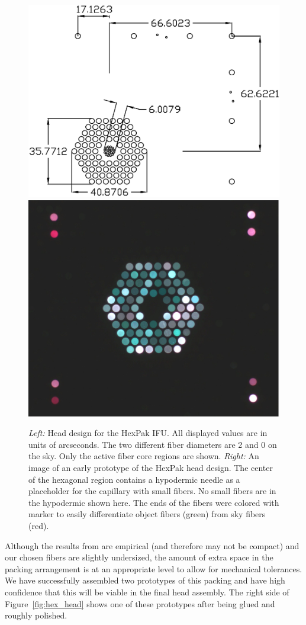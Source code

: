 \begin{figure}[t]
    \centering
    \includegraphics[width=.55\textwidth]{Pak_build/figs/hexpak}
    \hfill
    \includegraphics[width=.42\textwidth]{Pak_build/figs/hex_proto}
    \vspace{1.5mm}
    \caption[HexPak Design]{\fixspacing \emph{Left:} Head design for the
      HexPak IFU.  All displayed values are in units of arcseconds.  The two
      different fiber diameters are 2 and 0 on the sky.  Only
      the active fiber core regions are shown.  \emph{Right:} An image of an
      early prototype of the HexPak head design.  The center of the hexagonal
      region contains a hypodermic needle as a placeholder for the capillary
      with small fibers.  No small fibers are in the hypodermic shown here.
      The ends of the fibers were colored with marker to easily differentiate
      object fibers (green) from sky fibers (red).
    \label{fig:hexpak}}
\end{figure}


Although the results from \citet{Kravitz67} are empirical (and
therefore may not be compact) and our chosen fibers are slightly undersized,
the amount of extra space in the packing arrangement is at an appropriate
level to allow for mechanical tolerances.  We have successfully assembled two
prototypes of this packing and have high confidence that this will be viable
in the final head assembly.  The right side of
Figure~\ref{fig:hex_head} shows one of these prototypes after being
glued and roughly polished.


